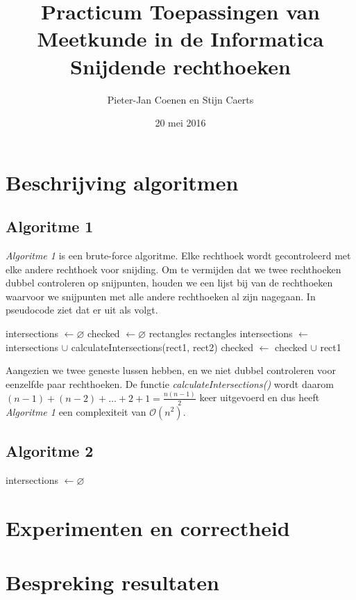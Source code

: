 \documentclass[11pt,a4paper,titlepage]{article}
\author{Pieter-Jan Coenen en Stijn Caerts}
\title{Practicum Toepassingen van Meetkunde in de Informatica \\ Snijdende rechthoeken}
\date{20 mei 2016}
\begin{document}
	\maketitle
	\tableofcontents
	\newpage
	\section{Beschrijving algoritmen}
	\subsection{Algoritme 1}
	\emph{Algoritme 1} is een brute-force algoritme. Elke rechthoek wordt gecontroleerd met elke andere rechthoek voor snijding. Om te vermijden dat we twee rechthoeken dubbel controleren op snijpunten, houden we een lijst bij van de rechthoeken waarvoor we snijpunten met alle andere rechthoeken al zijn nagegaan. In pseudocode ziet dat er uit als volgt.
	\begin{algorithm}[H]
		\caption{}
		\begin{algorithmic}[1]
			\State intersections $\gets \varnothing $
			\State checked $\gets \varnothing $
			 {rectangles}
				 {rectangles}
						\State intersections $ \gets $ intersections $ \cup $ calculateIntersections(rect1, rect2)
					\EndIf
				\EndForEach
				\State checked $\gets$ checked $\cup$ rect1
			\EndForEach
		\end{algorithmic}
	\end{algorithm}
	Aangezien we twee geneste lussen hebben, en we niet dubbel controleren voor eenzelfde paar rechthoeken. De functie \emph{calculateIntersections()} wordt daarom $ (n-1) + (n-2) + \dots + 2 + 1 = \frac{n(n-1)}{2} $ keer uitgevoerd en dus heeft \emph{Algoritme 1} een complexiteit van $\mathcal{O}(n^2)$.
	
	\subsection{Algoritme 2}
	\begin{algorithm}[H]
		\caption{}
		\begin{algorithmic}[1]
			\State intersections $\gets \varnothing $
			
		\end{algorithmic}
	\end{algorithm}
	\section{Experimenten en correctheid}
	\section{Bespreking resultaten}
	
\end{document}
